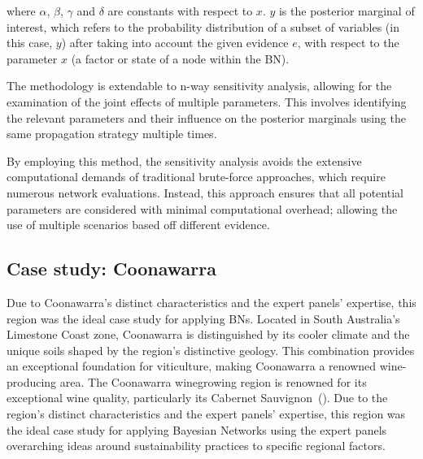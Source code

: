 \documentclass[fleqn,10pt]{wlscirep}
\begin{document}
where $\alpha$, $\beta$, $\gamma$ and $\delta$ are constants with respect to $x$. $y$ is the posterior marginal of interest, which refers to the probability distribution of a subset of variables (in this case, $y$) after taking into account the given evidence $e$, with respect to the parameter $x$ (a factor or state of a node within the BN).








The methodology is extendable to n-way sensitivity analysis, allowing for the examination of the joint effects of multiple parameters. This involves identifying the relevant parameters and their influence on the posterior marginals using the same propagation strategy multiple times.

By employing this method, the sensitivity analysis avoids the extensive computational demands of traditional brute-force approaches, which require numerous network evaluations. Instead, this approach ensures that all potential parameters are considered with minimal computational overhead; allowing the use of multiple scenarios based off different evidence.

\subsection*{Case study: Coonawarra}

Due to Coonawarra's distinct characteristics and the expert panels' expertise, this region was the ideal case study for applying BNs. Located in South Australia's Limestone Coast zone, Coonawarra is distinguished by its cooler climate and the unique soils shaped by the region's distinctive geology. This combination provides an exceptional foundation for viticulture, making Coonawarra a renowned wine-producing area. The Coonawarra winegrowing region is renowned for its exceptional wine quality, particularly its Cabernet Sauvignon~(\cite{hallidayAustralianWineEncyclopedia2009}). Due to the region's distinct characteristics and the expert panels' expertise, this region was the ideal case study for applying Bayesian Networks using the expert panels overarching ideas around sustainability practices to specific regional factors.
\end{document}
